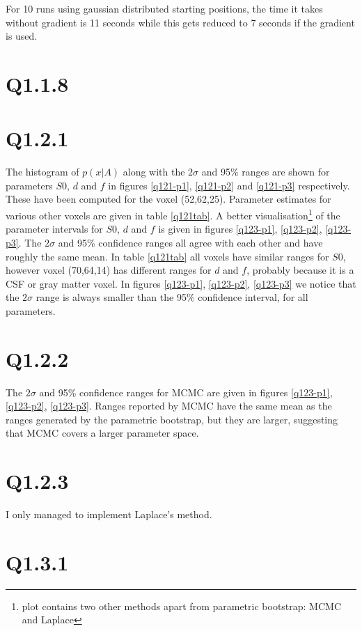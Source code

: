 \documentclass[11pt,a4paper,oneside]{report}
\begin{document}
For 10 runs using gaussian distributed starting positions, the time it takes without gradient is 11 seconds while this gets reduced to 7 seconds if the gradient is used. 


\section*{Q1.1.8}

\section*{Q1.2.1}

The histogram of $p(x|A)$ along with the $2\sigma$ and 95\% ranges are shown for parameters $S0$, $d$ and $f$ in figures \ref{q121-p1}, \ref{q121-p2} and \ref{q121-p3} respectively. These have been computed for the voxel (52,62,25). Parameter estimates for various other voxels are given in table \ref{q121tab}. A better visualisation\footnote{plot contains two other methods apart from parametric bootstrap: MCMC and Laplace} of the parameter intervals for $S0$, $d$ and $f$  is given in figures \ref{q123-p1}, \ref{q123-p2}, \ref{q123-p3}. The $2\sigma$ and 95\% confidence ranges all agree with each other and have roughly the same mean. In table \ref{q121tab} all voxels have similar ranges for $S0$, however voxel (70,64,14) has different ranges for 
$d$ and $f$, probably because it is a CSF or gray matter voxel. In figures \ref{q123-p1}, \ref{q123-p2}, \ref{q123-p3} we notice that the $2\sigma$ range is always smaller than the 95\% confidence interval, for all parameters. 

\section*{Q1.2.2}

 The $2\sigma$ and 95\% confidence ranges for MCMC are given in figures \ref{q123-p1}, \ref{q123-p2}, \ref{q123-p3}. Ranges reported by MCMC have the same mean as the ranges generated by the parametric bootstrap, but they are larger, suggesting that MCMC covers a larger parameter space.

\section*{Q1.2.3}

I only managed to implement Laplace's method. 

\section*{Q1.3.1}
\end{document}
